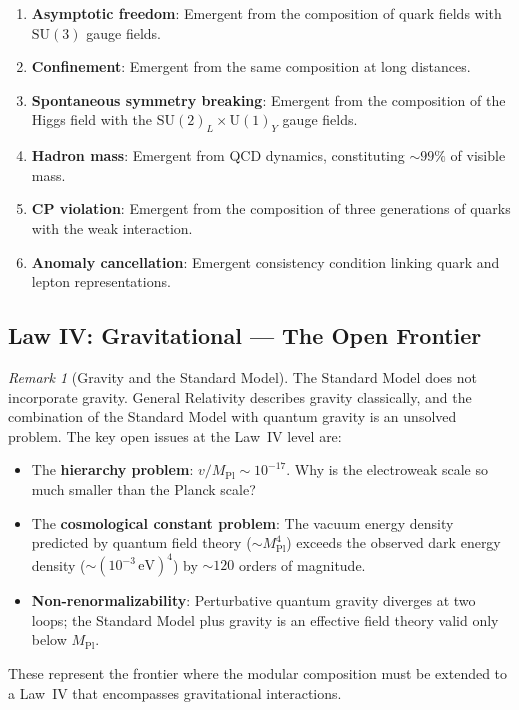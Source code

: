 \documentclass[12pt]{article}
\theoremstyle{definition}
\theoremstyle{remark}
\newtheorem{remark}[theorem]{Remark}
\begin{document}
\begin{enumerate}
    \item \textbf{Asymptotic freedom}: Emergent from the composition of quark fields with $\mathrm{SU}(3)$ gauge fields.
    \item \textbf{Confinement}: Emergent from the same composition at long distances.
    \item \textbf{Spontaneous symmetry breaking}: Emergent from the composition of the Higgs field with the $\mathrm{SU}(2)_L \times \mathrm{U}(1)_Y$ gauge fields.
    \item \textbf{Hadron mass}: Emergent from QCD dynamics, constituting $\sim 99\%$ of visible mass.
    \item \textbf{CP violation}: Emergent from the composition of three generations of quarks with the weak interaction.
    \item \textbf{Anomaly cancellation}: Emergent consistency condition linking quark and lepton representations.
\end{enumerate}

\subsection{Law IV: Gravitational --- The Open Frontier}

\begin{remark}[Gravity and the Standard Model]
\label{rem:gravity}
The Standard Model does not incorporate gravity. General Relativity describes gravity classically, and the combination of the Standard Model with quantum gravity is an unsolved problem. The key open issues at the Law~IV level are:
\begin{itemize}
    \item The \textbf{hierarchy problem}: $v / M_{\mathrm{Pl}} \sim 10^{-17}$. Why is the electroweak scale so much smaller than the Planck scale?
    \item The \textbf{cosmological constant problem}: The vacuum energy density predicted by quantum field theory ($\sim M_{\mathrm{Pl}}^4$) exceeds the observed dark energy density ($\sim (10^{-3}\,\mathrm{eV})^4$) by $\sim 120$ orders of magnitude.
    \item \textbf{Non-renormalizability}: Perturbative quantum gravity diverges at two loops; the Standard Model plus gravity is an effective field theory valid only below $M_{\mathrm{Pl}}$.
\end{itemize}
These represent the frontier where the modular composition must be extended to a Law~IV that encompasses gravitational interactions.
\end{remark}
\end{document}
